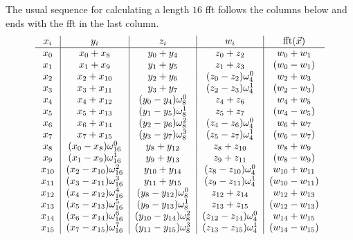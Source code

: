 \documentclass[12 pt]{amsart}
\newcommand\T{\rule{0pt}{-1.0ex}}       %
\newcommand\B{\rule[0.5ex]{0pt}{0pt}} %
\newcommand{\om}[2] {\omega_{#1}^{#2}}
\begin{document}
The usual sequence for calculating a length $16$ fft follows the columns below and ends with
the fft in the last column.
\begin{equation}
\label{ifft_fma}
\begin{tabular}{c|c|c|c|c}
$x_i$ & $y_i$ & $z_i$ & $w_i$ & $\operatorname{fft}(\vec{x})$\\
\hline
 $x_{0}$ &  $x_{0}+x_{8}$              & $y_{0}+y_{4}$              & $z_{0}+z_{2}$              & $w_{0} + w_{1}$\T\B\\
 $x_{1}$ &  $x_{1}+x_{9}$              & $y_{1}+y_{5}$              & $z_{1}+z_{3}$              & $(w_{0} - w_{1})$\T\B\\
 $x_{2}$ &  $x_{2}+x_{10}$             & $y_{2}+y_{6}$              & $(z_{0}-z_{2})\om{4}{0}$   & $w_{2} + w_{3}$\T\B\\
 $x_{3}$ &  $x_{3}+x_{11}$             & $y_{3}+y_{7}$              & $(z_{2}-z_{3})\om{4}{1}$   & $(w_{2} - w_{3})$\T\B\\
 $x_{4}$ &  $x_{4}+x_{12}$             & $(y_{0}-y_{4})\om{8}{0}$   & $z_{4}+z_{6}$              & $w_{4} + w_{5}$\T\B\\
 $x_{5}$ &  $x_{5}+x_{13}$             & $(y_{1}-y_{5})\om{8}{1}$   & $z_{5}+z_{7}$              & $(w_{4} - w_{5})$\T\B\\
 $x_{6}$ &  $x_{6}+x_{14}$             & $(y_{2}-y_{6})\om{8}{2}$   & $(z_{4}-z_{6})\om{4}{0}$   & $w_{6} + w_{7}$\T\B\\
 $x_{7}$ &  $x_{7}+x_{15}$             & $(y_{3}-y_{7})\om{8}{3}$   & $(z_{5}-z_{7})\om{4}{1}$   & $(w_{6} - w_{7})$\T\B\\
 $x_{8}$ &  $(x_{0}-x_{8})\om{16}{0}$  & $y_{8}+y_{12}$             & $z_{8}+z_{10}$             & $w_{8} + w_{9}$\T\B\\
 $x_{9}$ &  $(x_{1}-x_{9})\om{16}{1}$  & $y_{9}+y_{13}$             & $z_{9}+z_{11}$             & $(w_{8} - w_{9})$\T\B\\
$x_{10}$ &  $(x_{2}-x_{10})\om{16}{2}$ & $y_{10}+y_{14}$            & $(z_{8}-z_{10})\om{4}{0}$  & $w_{10} + w_{11}$\T\B\\
$x_{11}$ &  $(x_{3}-x_{11})\om{16}{3}$ & $y_{11}+y_{15}$            & $(z_{9}-z_{11})\om{4}{1}$  & $(w_{10} - w_{11})$\T\B\\
$x_{12}$ &  $(x_{4}-x_{12})\om{16}{4}$ & $(y_{8}-y_{12})\om{8}{0}$  & $z_{12}+z_{14}$            & $w_{12} + w_{13}$\T\B\\
$x_{13}$ &  $(x_{5}-x_{13})\om{16}{5}$ & $(y_{9}-y_{13})\om{8}{1}$  & $z_{13}+z_{15}$            & $(w_{12} - w_{13})$\T\B\\
$x_{14}$ &  $(x_{6}-x_{14})\om{16}{6}$ & $(y_{10}-y_{14})\om{8}{2}$ & $(z_{12}-z_{14})\om{4}{0}$ & $w_{14} + w_{15}$\T\B\\
$x_{15}$ &  $(x_{7}-x_{15})\om{16}{7}$ & $(y_{11}-y_{15})\om{8}{3}$ & $(z_{13}-z_{15})\om{4}{1}$ & $(w_{14} - w_{15})$\T\B\\
\end{tabular} 
\end{equation}
\end{document}
